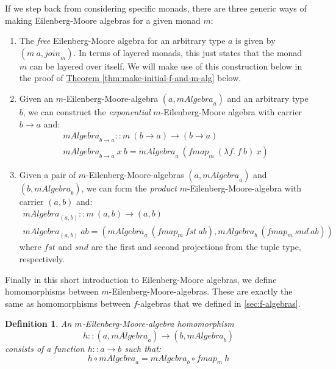 \documentclass{jfp1}
\newtheorem{definition}{Definition}
\newcommand{\thmref}[1]{\hyperref[#1]{Theorem \ref*{#1}}}
\begin{document}
If we step back from considering specific monads, there are three
generic ways of making Eilenberg-Moore algebras for a given monad $m$:
\begin{enumerate}
\item The \emph{free} Eilenberg-Moore algebra for an arbitrary type
  $a$ is given by $(m~a, \mathit{join}_m)$. In terms of layered
  monads, this just states that the monad $m$ can be layered over
  itself. We will make use of this construction below in the proof of
  \thmref{thm:make-initial-f-and-m-alg} below.
\item Given an $m$-Eilenberg-Moore-algebra $(a, \mathit{mAlgebra}_a)$
  and an arbitrary type $b$, we can construct the \emph{exponential}
  $m$-Eilenberg-Moore algebra with carrier $b \to a$ and:
  \begin{displaymath}
    \begin{array}{l}
      \mathit{mAlgebra}_{b \to a} :: m~(b \to a) \to (b \to a) \\
      \mathit{mAlgebra}_{b \to a}~x~b = \mathit{mAlgebra}_a~(\mathit{fmap}_m~(\lambda f.~f~b)~x)
    \end{array}
  \end{displaymath}
\item Given a pair of $m$-Eilenberg-Moore-algebras $(a,
  \mathit{mAlgebra}_a)$ and $(b, \mathit{mAlgebra}_b)$, we can form
  the \emph{product} $m$-Eilenberg-Moore-algebra with carrier $(a,b)$
  and:
  \begin{displaymath}
    \begin{array}{l}
      \mathit{mAlgebra}_{(a,b)} :: m~(a,b) \to (a,b) \\
      \mathit{mAlgebra}_{(a,b)}~\mathit{ab} = (\mathit{mAlgebra}_a~(\mathit{fmap}_m~\mathit{fst}~\mathit{ab}), \mathit{mAlgebra}_b~(\mathit{fmap}_m~\mathit{snd}~\mathit{ab}))
    \end{array}
  \end{displaymath}
  where $\mathit{fst}$ and $\mathit{snd}$ are the first and second
  projections from the tuple type, respectively.
\end{enumerate}

Finally in this short introduction to Eilenberg-Moore algebras, we
define homomorphisms between $m$-Eilenberg-Moore-algebras. These are
exactly the same as homomorphisms between $f$-algebras that we defined
in \autoref{sec:f-algebras}.

\begin{definition}
  An $m$-Eilenberg-Moore-algebra homomorphism
  \begin{displaymath}
    h :: (a, \mathit{mAlgebra}_a) \to (b, \mathit{mAlgebra}_b)
  \end{displaymath}
  consists of a function $h :: a \to b$ such that:
  \begin{displaymath}
    h \circ \mathit{mAlgebra}_a = \mathit{mAlgebra}_b \circ \mathit{fmap}_m~h
  \end{displaymath}
\end{definition}
\end{document}
